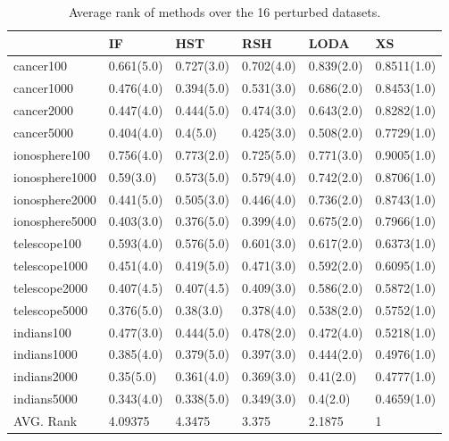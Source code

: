\begin{table}
	\centering
    \begin{tabular}{llllll}
    \toprule
               & IF         & HST        & RSH        & LODA       & XS          \\	\hline
    cancer100      & 0.661(5.0) & 0.727(3.0) & 0.702(4.0) & 0.839(2.0) & 0.8511(1.0) \\
    cancer1000     & 0.476(4.0) & 0.394(5.0) & 0.531(3.0) & 0.686(2.0) & 0.8453(1.0) \\
    cancer2000     & 0.447(4.0) & 0.444(5.0) & 0.474(3.0) & 0.643(2.0) & 0.8282(1.0) \\
    cancer5000     & 0.404(4.0) & 0.4(5.0)   & 0.425(3.0) & 0.508(2.0) & 0.7729(1.0) \\
    ionosphere100  & 0.756(4.0) & 0.773(2.0) & 0.725(5.0) & 0.771(3.0) & 0.9005(1.0) \\
    ionosphere1000 & 0.59(3.0)  & 0.573(5.0) & 0.579(4.0) & 0.742(2.0) & 0.8706(1.0) \\
    ionosphere2000 & 0.441(5.0) & 0.505(3.0) & 0.446(4.0) & 0.736(2.0) & 0.8743(1.0) \\
    ionosphere5000 & 0.403(3.0) & 0.376(5.0) & 0.399(4.0) & 0.675(2.0) & 0.7966(1.0) \\
    telescope100   & 0.593(4.0) & 0.576(5.0) & 0.601(3.0) & 0.617(2.0) & 0.6373(1.0) \\
    telescope1000  & 0.451(4.0) & 0.419(5.0) & 0.471(3.0) & 0.592(2.0) & 0.6095(1.0) \\
    telescope2000  & 0.407(4.5) & 0.407(4.5) & 0.409(3.0) & 0.586(2.0) & 0.5872(1.0) \\
    telescope5000  & 0.376(5.0) & 0.38(3.0)  & 0.378(4.0) & 0.538(2.0) & 0.5752(1.0) \\
    indians100     & 0.477(3.0) & 0.444(5.0) & 0.478(2.0) & 0.472(4.0) & 0.5218(1.0) \\
    indians1000    & 0.385(4.0) & 0.379(5.0) & 0.397(3.0) & 0.444(2.0) & 0.4976(1.0) \\
    indians2000    & 0.35(5.0)  & 0.361(4.0) & 0.369(3.0) & 0.41(2.0)  & 0.4777(1.0) \\
    indians5000    & 0.343(4.0) & 0.338(5.0) & 0.349(3.0) & 0.4(2.0)   & 0.4659(1.0) \\	\hline
    AVG. Rank              & 4.09375    & 4.3475     & 3.375      & 2.1875     & 1           \\    \bottomrule
    \end{tabular}
    \caption {Average rank of methods over the 16 perturbed datasets.}
        \label{table:LowDimRanks}
\end{table}



